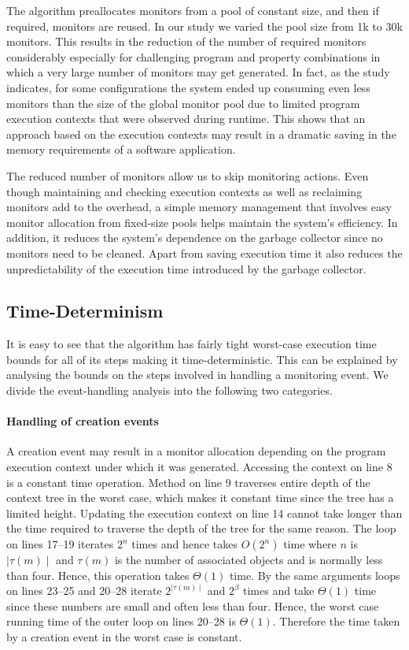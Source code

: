 The algorithm preallocates monitors from a pool of constant size, and then if 
required, monitors are reused. In our study we varied the pool size from 1k 
to 30k monitors. This results in the reduction of the number of required monitors 
considerably especially for challenging program and property combinations in 
which a very large number of monitors may get generated. In fact, as the study indicates,
for some configurations the system ended up consuming
even less monitors than the size of the global monitor pool due to
limited program execution contexts that were
observed during runtime. This shows that an approach based on the execution
contexts may result in a dramatic saving in the memory requirements of a
software application.

The reduced number of monitors allow us to skip monitoring actions. Even though
maintaining and checking execution contexts as well as reclaiming monitors add to the overhead, 
a simple memory management that involves easy monitor allocation from fixed-size pools helps maintain the
system's efficiency. In addition, it reduces the system's dependence on the garbage collector since no
monitors need to be cleaned. Apart from saving execution time it also reduces the unpredictability
of the execution time introduced by the garbage collector.

\subsection{Time-Determinism}
\label{subsec:timedeterminism}

It is easy to see that the algorithm has fairly tight worst-case execution time bounds
for all of its steps making it time-deterministic. This can be explained
by analysing the bounds on the steps involved in handling a monitoring event.
We divide the event-handling analysis into the following two categories.

\paragraph{Handling of creation events} A creation event may result in a monitor
allocation depending on the program execution context under which it was generated.
Accessing the context on line 8 is a constant time operation. Method  on
line 9 traverses entire depth of the context tree in the worst case, which makes it
constant time since the tree has a limited height. Updating the execution context on line 14
cannot take longer than the time required to traverse the depth of the tree for the same reason.
The loop on lines 17--19 iterates $2^n$ times and hence takes $O(2^n)$ time 
where $n$ is $\mid\tau(m)\mid$ and $\tau(m)$ is the number of associated objects 
and is normally less than four. Hence, this operation takes $\Theta(1)$ time. By the same arguments
loops on lines 23--25 and 20--28 iterate $2^{\mid\tau(m)\mid}$ and $2^\beta$ times and take $\Theta(1)$
time since these numbers are small and often less than four. Hence, the worst case running time
of the outer loop on lines 20--28 is $\Theta(1)$. Therefore the time taken by a creation event in the
worst case is constant.

